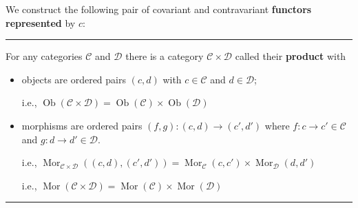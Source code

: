 \documentclass[12pt]{article}
\newcommand{\keyword}[1]{\textbf{#1}}
\newcommand{\sepline}{\rule{\textwidth}{0.4pt}}
\theoremstyle{definition}
\newcommand{\CC}{\mathcal{C}}
\newcommand{\DD}{\mathcal{D}}
\newcommand{\<}{\left\langle}
\renewcommand{\>}{\right\rangle}
\renewcommand{\Mapsto}{\longmapsto}
\DeclareMathOperator{\Ob}{Ob}
\DeclareMathOperator{\Mor}{Mor}
\renewcommand{\_}[1]{{_{#1}}}
\begin{document}
We construct the following pair of covariant and contravariant \keyword{functors represented} by $c$:
\begin{center}
    \hspace{2cm}
\end{center}



\sepline

For any categories $\CC$ and $\DD$ there is a category $\CC \times \DD$ called their \keyword{product} with
\begin{itemize}
    \item objects are ordered pairs $(c, d)$ with $c \in \CC$ and $d \in \DD$;
    
    i.e., $\Ob(\CC \times \DD) = \Ob(\CC) \times \Ob(\DD)$
    \item morphisms are ordered pairs $(f, g) : (c, d) \to (c', d')$ where $f : c \to c' \in \CC$ and $g : d \to d' \in \DD$.
    
    i.e., $\Mor_{\CC \times \DD}((c, d), (c', d')) = \Mor_{\CC}(c, c') \times \Mor_{\DD}(d, d')$

    i.e., $\Mor(\CC \times \DD) = \Mor(\CC) \times \Mor(\DD)$
\end{itemize}

\sepline
\end{document}

